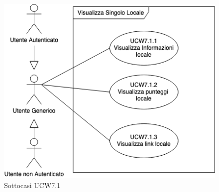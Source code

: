 \begin{figure}[H]
    \centering
        \includegraphics[scale=0.5]{UC_images/UCW7-1-x.png}
        \caption{Sottocasi UCW7.1}
\end{figure}

